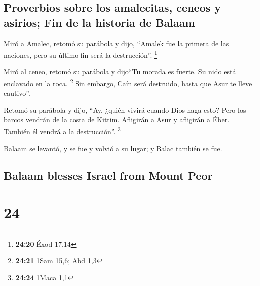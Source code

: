\begin{paracol}{2}
\hypertarget{proverbios-sobre-los-amalecitas-ceneos-y-asirios-fin-de-la-historia-de-balaam}{%
\subsection{Proverbios sobre los amalecitas, ceneos y asirios; Fin de la
historia de
Balaam}\label{proverbios-sobre-los-amalecitas-ceneos-y-asirios-fin-de-la-historia-de-balaam}}

 Miró a Amalec, retomó su parábola y dijo, ``Amalek fue
la primera de las naciones, pero su último fin será la destrucción''.
\footnote{\textbf{24:20} Éxod 17,14}

 Miró al ceneo, retomó su parábola y dijo``Tu morada es
fuerte. Su nido está enclavado en la roca. \footnote{\textbf{24:21} 1Sam
  15,6; Abd 1,3}  Sin embargo, Caín será destruido, hasta
que Asur te lleve cautivo''.

 Retomó su parábola y dijo, ``Ay, ¿quién vivirá cuando
Dios haga esto?  Pero los barcos vendrán de la costa de
Kittim. Afligirán a Asur y afligirán a Éber. También él vendrá a la
destrucción''. \footnote{\textbf{24:24} 1Maca 1,1}

 Balaam se levantó, y se fue y volvió a su lugar; y Balac
también se fue.

\switchcolumn
\begin{otherlanguage}{english}

\hypertarget{balaam-blesses-israel-from-mount-peor}{%
\subsection{Balaam blesses Israel from Mount
Peor}\label{balaam-blesses-israel-from-mount-peor}}

\hypertarget{section-47}{%
\section{24}\label{section-47}}


\end{otherlanguage}
\end{paracol}
